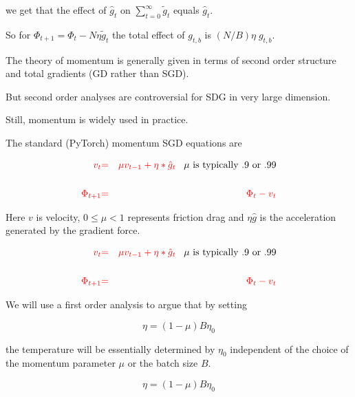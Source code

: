 {\vfill
we get that the effect of $\hat{g}_t$ on $\sum_{t=0}^\infty \tilde{g}_t$ equals $\hat{g}_t$.

\vfill
So for $\Phi_{t+1} =  \Phi_t - N\eta\tilde{g}_t$ the total effect of $g_{t,b}$ is $(N/B)\eta\; g_{t,b}$.


The theory of momentum is generally given in terms of second order structure and total gradients (GD rather than SGD).

\vfill
But second order analyses are controversial for SDG in very large dimension.

\vfill
Still, momentum is widely used in practice.


The standard (PyTorch) momentum SGD equations are

\begin{eqnarray*}
  {\color{red} v_t} & {\color{red} =} & {\color{red} \mu v_{t-1} + \eta * \hat{g}_t} \;\;\;\mbox{$\mu$ is typically .9 or .99}\\
  \\
  {\color{red} \Phi_{t+1}} & {\color{red} =} & {\color{red} \Phi_t -  v_t} \\
\end{eqnarray*}

\vfill
Here $v$ is velocity, $0 \leq \mu < 1$ represents friction drag and $\eta \hat{g}$ is the acceleration generated by the gradient force.


\begin{eqnarray*}
  {\color{red} v_t} & {\color{red} =} & {\color{red} \mu v_{t-1} + \eta * \hat{g}_t} \;\;\;\mbox{$\mu$ is typically .9 or .99}\\
  \\
  {\color{red} \Phi_{t+1}} & {\color{red} =} & {\color{red} \Phi_t -  v_t} \\
\end{eqnarray*}

\vfill
We will use a first order analysis to argue that by setting

{\color{red} $$\eta = (1-\mu)B\eta_0$$}

\vfill
the temperature will be essentially determined by $\eta_0$ independent of the choice of the momentum parameter $\mu$ or the batch size $B$.


{\color{red} $$\eta = (1-\mu)B\eta_0$$}

}
